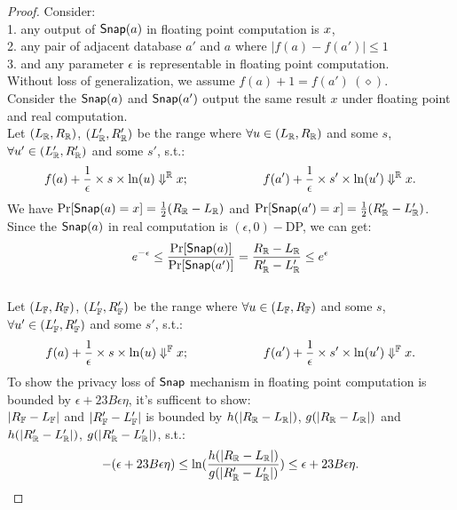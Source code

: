 \documentclass[a4paper,11pt]{article}
\begin{document}
\begin{proof}
%
%
Consider:
\\
1. any %
output of $\mathsf{Snap}(a)$ in floating point computation is $x$,
%
\\
2. any pair of adjacent database $a'$ and $a$ where $|f(a) - f(a')| \leq 1$
%
\\
3. and any parameter $\epsilon$ is representable in floating point computation.
%
\\
Without loss of generalization, we assume $f(a) + 1 = f(a') ~ (\diamond)$.
%
\\
%
Consider the $\mathsf{Snap}(a)$ and $\mathsf{Snap}(a')$ output the same result $x$ under floating point and real computation.
%
\\
%
Let $(L_{\mathbb{R}}, R_{\mathbb{R}})$, $(L_{\mathbb{R}}', R_{\mathbb{R}}')$ be the range where 
$\forall u \in (L_{\mathbb{R}}, R_{\mathbb{R}})$ and some $s$, 
$\forall u' \in (L_{\mathbb{R}}', R_{\mathbb{R}}')$ and some $s'$, s.t.:
%
$$f(a) + \frac{1}{\epsilon} \times s \times \ln (u) \Downarrow^{\mathbb{R}} x; 
~~~~~~~~~~~~~~~~~~
f(a') + \frac{1}{\epsilon} \times s' \times \ln (u') \Downarrow^{\mathbb{R}} x.$$
%
We have $\Pr[\mathsf{Snap}(a) = x] = \frac{1}{2} (R_{\mathbb{R}} - L_{\mathbb{R}})$ 
and $\Pr[\mathsf{Snap}(a') = x] = \frac{1}{2} (R_{\mathbb{R}}' - L_{\mathbb{R}}')$.
%
\\
%
Since the $\mathsf{Snap}(a)$ in real computation is $(\epsilon, 0)-$DP, we can get:
\[
	e^{-\epsilon} \leq \frac{\Pr[\mathsf{Snap}(a)]}{\Pr[\mathsf{Snap}(a')]}
	= \frac{R_{\mathbb{R}} - L_{\mathbb{R}}}{R_{\mathbb{R}}' - L_{\mathbb{R}}'} \leq e^{\epsilon}
\]
%
\\
%
Let $(L_{\mathbb{F}}, R_{\mathbb{F}})$, $(L_{\mathbb{F}}', R_{\mathbb{F}}')$ be the range where 
$\forall u \in (L_{\mathbb{F}}, R_{\mathbb{F}})$ and some $s$, 
$\forall u' \in (L_{\mathbb{F}}', R_{\mathbb{F}}')$ and some $s'$, s.t.:
%
$$f(a) + \frac{1}{\epsilon} \times s \times \ln (u) \Downarrow^{\mathbb{F}} x; 
~~~~~~~~~~~~~~~~~~
f(a') + \frac{1}{\epsilon} \times s' \times \ln (u') \Downarrow^{\mathbb{F}} x.$$
%
To show the privacy loss of $\mathsf{Snap}$ mechanism in floating point computation is bounded by $\epsilon + 23 B \epsilon \eta$, it’s sufficent to show:
%
\\
%
$|R_{\mathbb{F}} - L_{\mathbb{F}}|$ and $|R_{\mathbb{F}}' - L_{\mathbb{F}}'|$
is bounded by $h(|{R_{\mathbb{R}}} - {L_{\mathbb{R}}}|)$, $g(|{R_{\mathbb{R}}} - {L_{\mathbb{R}}}|)$ and $h(|{R_{\mathbb{R}}'} - {L_{\mathbb{R}}'}|)$, $g(|{R_{\mathbb{R}}'} - {L_{\mathbb{R}}'}|)$,
%
s.t.:
%
\[
	-(\epsilon + 23 B \epsilon \eta)
	\leq \ln( \frac{h(|{R_{\mathbb{R}}} - {L_{\mathbb{R}}}|)}{g(|{R_{\mathbb{R}}'} - {L_{\mathbb{R}}'}|)} )
	\leq \epsilon + 23 B \epsilon \eta.
\]


\end{proof}
\end{document}
